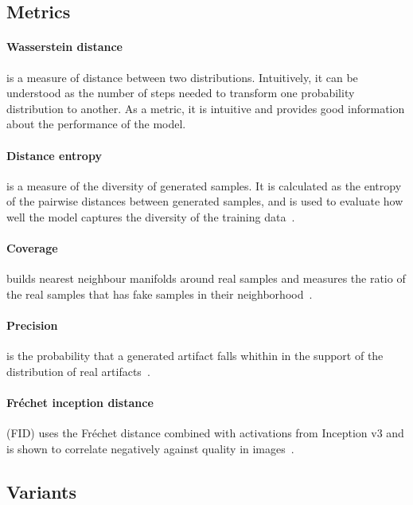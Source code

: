 \documentclass{article}
\begin{document}
\subsection{Metrics}

\paragraph{Wasserstein distance} is a measure of distance between two distributions. Intuitively, it can be understood as the number of steps needed to transform one probability distribution to another. \cite{lil} As a metric, it is intuitive and provides good information about the performance of the model.

\paragraph{Distance entropy} is a measure of the diversity of generated samples. It is calculated as the entropy of the pairwise distances between generated samples, and is used to evaluate how well the model captures the diversity of the training data~\cite{naeem2020reliablefidelitydiversitymetrics}.

\paragraph{Coverage} builds nearest neighbour manifolds around real samples and measures the ratio of the real samples that has fake samples in their neighborhood~\cite{naeem2020reliablefidelitydiversitymetrics}.

\paragraph{Precision} is the probability that a generated artifact falls whithin in the support of the distribution of real artifacts~\cite{kynk2019}.

\paragraph{Fréchet inception distance} (FID) uses the Fréchet distance combined with activations from Inception v3 and is shown to correlate negatively against quality in images~\cite{yu2021frechet}.

\subsection{Variants}
\end{document}
